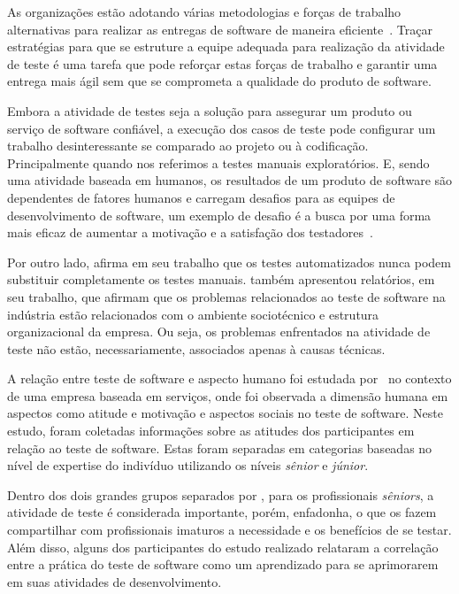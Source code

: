 As organizações estão adotando várias metodologias e forças de trabalho alternativas para realizar as entregas de software de maneira eficiente~\cite{dubey2017personas}. Traçar estratégias para que se estruture a equipe adequada para realização da atividade de teste é uma tarefa que pode reforçar estas forças de trabalho e garantir uma entrega mais ágil sem que se comprometa a qualidade do produto de software.

Embora a atividade de testes seja a solução para assegurar um produto ou serviço de software confiável, a execução dos casos de teste pode configurar um trabalho desinteressante se comparado ao projeto ou à codificação. Principalmente quando nos referimos a testes manuais exploratórios. E, sendo uma atividade baseada em humanos, os resultados de um produto de software são dependentes de fatores humanos e carregam desafios para as equipes de desenvolvimento de software, um exemplo de desafio é a busca por uma forma mais eficaz de aumentar a motivação e a satisfação dos testadores~\cite{deak2016challenges}.

Por outro lado, \cite{berner2005observations} afirma em seu trabalho que os testes automatizados nunca podem substituir completamente os testes manuais. \cite{martin2007good} também apresentou relatórios, em seu trabalho, que afirmam que os problemas relacionados ao teste de software na indústria estão relacionados com o ambiente sociotécnico e estrutura organizacional da empresa. Ou seja, os problemas enfrentados na atividade de teste não estão, necessariamente, associados apenas à causas técnicas.

A relação entre teste de software e aspecto humano foi estudada por~\cite{shah2010studying} no contexto de uma empresa baseada em serviços, onde foi observada a dimensão humana em aspectos como atitude e motivação e aspectos sociais no teste de software. Neste estudo, foram coletadas informações sobre as atitudes dos participantes em relação ao teste de software. Estas foram separadas em categorias baseadas no nível de expertise do indivíduo utilizando os níveis \textit{sênior} e \textit{júnior}. 
 
Dentro dos dois grandes grupos separados por \cite{shah2010studying}, para os profissionais \textit{sêniors}, a atividade de teste é considerada importante, porém, enfadonha, o que os fazem compartilhar com profissionais imaturos a necessidade e os benefícios de se testar. Além disso, alguns dos participantes do estudo realizado relataram a correlação entre a prática do teste de software como um aprendizado para se aprimorarem em suas atividades de desenvolvimento.

